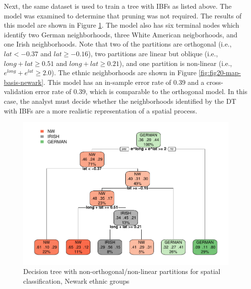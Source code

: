 \documentclass[]{elsarticle} %
\makeatletter
\def\maxwidth{\ifdim\Gin@nat@width>\linewidth\linewidth
\else\Gin@nat@width\fi}
\let\Oldincludegraphics\includegraphics
\renewcommand{\includegraphics}[1]{\Oldincludegraphics[width=\maxwidth]{#1}}
\makeatother
\begin{document}
Next, the same dataset is used to train a tree with IBFs as listed
above. The model was examined to determine that pruning was not
required. The results of this model are shown in Figure
\ref{fig:fig19-tree-basis-newark}. The model also has six terminal nodes
which identify two German neighborhoods, three White American
neigborhoods, and one Irish neighborhoods. Note that two of the
partitions are orthogonal (i.e., \(lat < -0.37\) and \(lat \ge -0.16\)),
two partitions are linear but oblique (i.e., \(long+lat \ge 0.51\) and
\(long+lat \ge 0.21\)), and one partition is non-linear (i.e.,
\(e^{long}+e^{lat} \ge 2.0\)). The ethnic neighborhoods are shown in
Figure \ref{fig:fig20-map-basis-newark}. This model has an in-sample
error rate of 0.39 and a cross-validation error rate of 0.39, which is
comparable to the orthogonal model. In this case, the analyst must
decide whether the neighborhoods identified by the DT with IBFs are a
more realistic representation of a spatial process.

\begin{figure}
\centering
\includegraphics{Trees_with_Base_Functions_v3_files/figure-latex/fig19-tree-basis-newark-1.pdf}
\caption{\label{fig:fig19-tree-basis-newark}Decision tree with
non-orthogonal/non-linear partitions for spatial classification, Newark
ethnic groups}
\end{figure}
\end{document}
